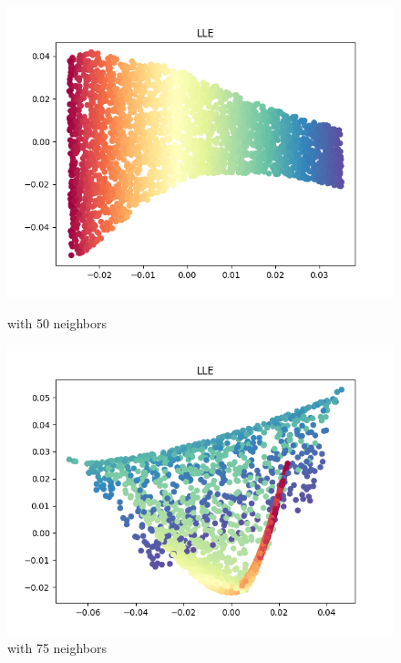 \documentclass[8pt]{article}
\begin{document}
\begin{figure}[H]
\begin{minipage}{0.32\textwidth}
        \includegraphics[width=\textwidth]{./Prob1/task2/out/check/task2LLECheck_nei_50.png}
        \caption{with 50 neighbors}
        \label{fig:Swiss Roll after LLE with 50 neighbors}
    \end{minipage}
    \hfill
    \begin{minipage}{0.32\textwidth}
        \includegraphics[width=\textwidth]{./Prob1/task2/out/check/task2LLECheck_nei_75.png}
        \caption{with 75 neighbors}
        \label{fig:Swiss Roll after LLE with 75 neighbors}
    \end{minipage}
    \hfill
    \begin{minipage}{0.32\textwidth}

\end{minipage}
\end{figure}
\end{document}

